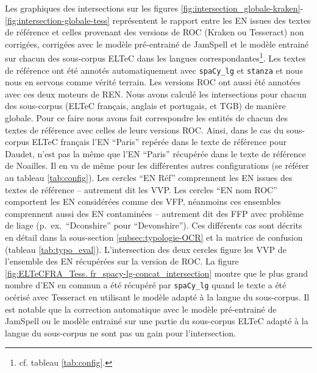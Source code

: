 Les graphiques des intersections sur les figures \ref{fig:intersection_globale-kraken}-\ref{fig:intersection-globale-tess} représentent le rapport entre les EN issues des textes de référence et celles provenant des versions de ROC (Kraken ou Tesseract) non corrigées, corrigées avec le modèle pré-entrainé de JamSpell et le modèle entrainé sur chacun des sous-corpus ELTeC dans les langues correspondantes\footnote{cf. tableau \ref{tab:config}.}. Les textes de référence ont été annotés automatiquement avec \texttt{spaCy\_lg} et \texttt{stanza} et nous nous en servons comme vérité terrain. Les versions ROC ont aussi été annotées avec ces deux moteurs de REN. Nous avons calculé les intersections pour chacun des sous-corpus (ELTeC français, anglais et portugais, et TGB) de manière globale. Pour ce faire nous avons fait correspondre les entités de chacun des textes de référence avec celles de leurs versions ROC. Ainsi, dans le cas du sous-corpus ELTeC français l'EN ``Paris'' repérée dans le texte de référence pour Daudet, n'est pas la même que l'EN ``Paris'' récupérée dans le texte de référence de Noailles. Il en va de même pour les différentes autres configurations (se référer au tableau \ref{tab:config}).
Les cercles ``EN Réf'' comprennent les EN issues des textes de référence -- autrement dit les VVP. Les cercles ``EN nom ROC'' comportent les EN considérées comme des VFP, néanmoins ces ensembles comprennent aussi des EN contaminées -- autrement dit des FFP avec problème de liage (p.\ ex.\ ``Dconshire'' pour ``Devonshire''). Ces différents cas sont décrits en détail dans la sous-section \ref{subsec:typologie-OCR} et la matrice de confusion (tableau \ref{tab:typo_eval}). L'intersection des deux cercles figure les VVP de l'ensemble des EN récupérées sur la version de ROC.
La figure \ref{fig:ELTeCFRA_Tess. fr_spacy-lg-concat_intersection} montre que le plus grand nombre d'EN en commun a été récupéré par \texttt{spaCy\_lg} quand le texte a été océrisé avec Tesseract en utilisant le modèle adapté à la langue du sous-corpus. Il est notable que la correction automatique avec le modèle pré-entrainé de JamSpell ou le modèle entrainé sur une partie du sous-corpus ELTeC adapté à la langue du sous-corpus ne sont pas un gain pour l'intersection. 
